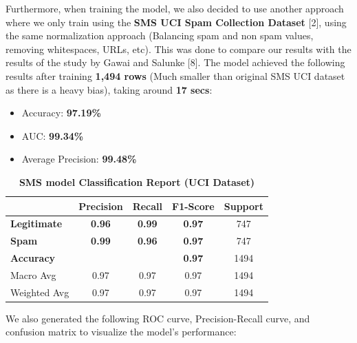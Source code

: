 \documentclass{article}
\begin{document}
\newpage

\noindent
Furthermore, when training the model, we also decided to use another approach where we only train using the \textbf{SMS UCI Spam Collection Dataset} [2], using the same normalization approach (Balancing spam and non spam values, removing whitespaces, URLs, etc). This was done to compare our results with the results of the study by Gawai and Salunke [8]. The model achieved the following results after training \textbf{1,494 rows} (Much smaller than original SMS UCI dataset as there is a heavy bias), taking around \textbf{17 secs}: 

\begin{itemize}
    \item Accuracy: \textbf{97.19\%}
    \item AUC: \textbf{99.34\%}
    \item Average Precision: \textbf{99.48\%}
\end{itemize}

\begin{table}[htbp]
    \centering
    \caption{\textbf{SMS model Classification Report (UCI Dataset)}}
    \begin{tabular}{l c c c c}
    \toprule
     & \textbf{Precision} & \textbf{Recall} & \textbf{F1-Score} & Support \\
    \midrule
    \textbf{Legitimate} & \textbf{0.96} & \textbf{0.99} & \textbf{0.97} & 747 \\
    \textbf{Spam} & \textbf{0.99} & \textbf{0.96} & \textbf{0.97} & 747 \\
    \midrule
    \textbf{Accuracy} & & & \textbf{0.97} & 1494 \\
    Macro Avg & 0.97 & 0.97 & 0.97 & 1494 \\
    Weighted Avg & 0.97 & 0.97 & 0.97 & 1494 \\
    \bottomrule
    \end{tabular}
    \label{tab:classification_report_3}
\end{table}

\noindent
We also generated the following ROC curve, Precision-Recall curve, and confusion matrix to visualize the model's performance:
\end{document}
